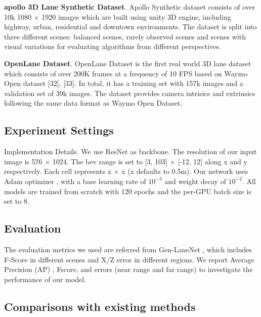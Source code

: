 \textbf {apollo 3D Lane Synthetic Dataset}. Apollo Synthetic
dataset \cite{guo2020gen} consists of over 10k 1080 × 1920 images which
are built using unity 3D engine, including highway, urban,
residential and downtown environments. The dataset is split
into three different scenes: balanced scenes, rarely observed
scenes and scenes with visual variations for evaluating algorithms from different perspectives.

\textbf {OpenLane Dataset}. OpenLane Dataset \cite{chen2022persformer} is the first
real world 3D lane dataset which consists of over 200K
frames at a frequency of 10 FPS based on Waymo Open
dataset [32], [33]. In total, it has a training set with 157k
images and a validation set of 39k images. The dataset
provides camera intrisics and extrinsics following the same
data format as Waymo Open Dataset.


\subsection{Experiment Settings}
\label{subsec:Experiment Settings}
Implementation Details. We use ResNet \cite{he2016deep} as backbone.
The resolution of our input image is 576 × 1024.
The bev range is set to [3, 103] × [-12, 12] along x and y respectively.
Each cell represents x × x (x defaults to 0.5m).
Our network uses Adam optimizer \cite{kingma2014adam}, with a base learning rate of $10^{-3}$ and weight decay of $10^{-2}$.
All models are trained from scratch with 120 epochs and the per-GPU batch size is set to 8.

\subsection{Evaluation}
\label{subsec:Evaluation}
The evaluation metrics we used are referred from Gen-LaneNet \cite{guo2020gen}, which includes F-Score in different scenes and X/Z error in different regions.
We report Average Precision (AP) , Fscore, and errors (near range and far range) to investigate the performance of our model.

\subsection{Comparisons with existing methods}
